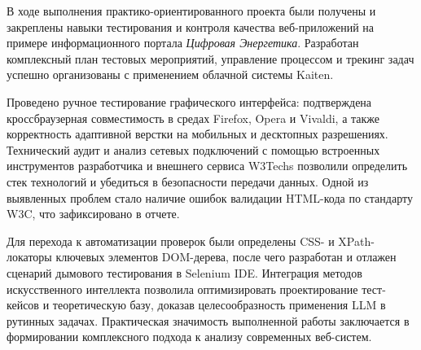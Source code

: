 В ходе выполнения практико-ориентированного проекта были получены и закреплены навыки тестирования и контроля качества веб-приложений на примере информационного портала \textit{Цифровая Энергетика}. Разработан комплексный план тестовых мероприятий, управление процессом и трекинг задач успешно организованы с применением облачной системы Kaiten.

Проведено ручное тестирование графического интерфейса: подтверждена кроссбраузерная совместимость в средах Firefox, Opera и Vivaldi, а также корректность адаптивной верстки на мобильных и десктопных разрешениях. Технический аудит и анализ сетевых подключений с помощью встроенных инструментов разработчика и внешнего сервиса W3Techs позволили определить стек технологий и убедиться в безопасности передачи данных. Одной из выявленных проблем стало наличие ошибок валидации HTML-кода по стандарту W3C, что зафиксировано в отчете.

Для перехода к автоматизации проверок были определены CSS- и XPath-локаторы ключевых элементов DOM-дерева, после чего разработан и отлажен сценарий дымового тестирования в Selenium IDE. Интеграция методов искусственного интеллекта позволила оптимизировать проектирование тест-кейсов и теоретическую базу, доказав целесообразность применения LLM в рутинных задачах. Практическая значимость выполненной работы заключается в формировании комплексного подхода к анализу современных веб-систем.